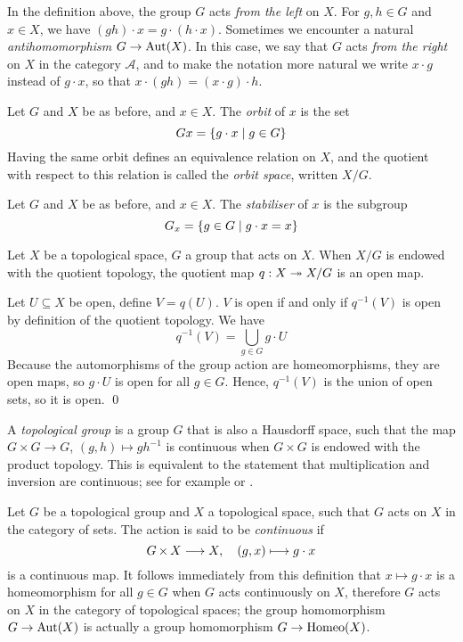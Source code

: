 In the definition above,
the group $G$ acts \emph{from the left} on $X$.
For $g, h \in G$ and $x \in X$,
we have $(gh) \cdot x = g \cdot (h \cdot x)$.
Sometimes we encounter a natural \emph{antihomomorphism} $G \to \Aut(X)$.
In this case,
we say that $G$ acts \emph{from the right} on $X$ in the category $\mathcal{A}$,
and to make the notation more natural we write $x \cdot g$ instead of $g \cdot x$,
so that $x \cdot (gh) = (x \cdot g) \cdot h$.

Let $G$ and $X$ be as before, and $x \in X$.
The \emph{orbit} of $x$ is the set
\[ Gx = \set{ g \cdot x \mid g \in G } \]
Having the same orbit defines an equivalence relation on $X$,
and the quotient with respect to this relation is called the \emph{orbit space},
written $X/G$.

Let $G$ and $X$ be as before, and $x \in X$.
The \emph{stabiliser} of $x$ is the subgroup
\[ G_x = \set{ g \in G \mid g \cdot x = x } \]

Let $X$ be a topological space, $G$ a group that acts on $X$.
When $X/G$ is endowed with the quotient topology,
the quotient map $q : X \surj X/G$ is an open map.

\proof
Let $U \subseteq X$ be open,
define $V = q(U)$.
$V$ is open if and only if $q^{-1}(V)$ is open
by definition of the quotient topology.
We have
\[ q^{-1}(V)
 = \bigcup_{g \in G} g \cdot U \]
Because the automorphisms of the group action are homeomorphisms,
they are open maps,
so $g \cdot U$ is open for all $g \in G$.
Hence, $q^{-1}(V)$ is the union of open sets,
so it is open.
\qed

A \emph{topological group} is a group $G$ that is also a Hausdorff space,
such that the map $G \times G \to G$, $(g, h) \mapsto gh^{-1}$ is continuous
when $G \times G$ is endowed with the product topology.
This is equivalent to the statement that multiplication and inversion are continuous;
see for example \parencite[ch.~\textsc{iii}, \S~1.1]{bourbaki1971} or \parencite[p.~276]{szekeres2004}.

Let $G$ be a topological group and $X$ a topological space,
such that $G$ acts on $X$ in the category of sets.
The action is said to be \emph{continuous} if
\[ G \times X \longto X,
\quad (g, x) \longmapsto g \cdot x \]
is a continuous map.
It follows immediately from this definition that
$x \mapsto g \cdot x$ is a homeomorphism for all $g \in G$ when $G$ acts continuously on $X$,
therefore $G$ acts on $X$ in the category of topological spaces;
the group homomorphism $G \to \Aut(X)$ is actually a group homomorphism $G \to \Homeo(X)$.

